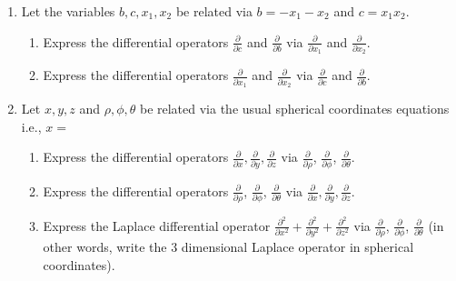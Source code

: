 \begin{enumerate}
\item Let the variables $b,c, x_1, x_2$ be related via $b=-x_1-x_2 $ and $c=x_1 x_2$.
\begin{enumerate}
\item Express the differential operators $\frac{\partial}{\partial c}$ and $\frac{\partial}{\partial b}$ via $\frac{\partial}{\partial x_1}$ and $\frac{\partial}{\partial x_2}$.
\item Express the differential operators  $\frac{\partial}{\partial x_1}$ and $\frac{\partial}{\partial x_2}$ via $\frac{\partial}{\partial c}$ and $\frac{\partial}{\partial b}$. 
\end{enumerate}

\item Let $x,y,z$ and $\rho, \phi,\theta$ be related via the usual spherical coordinates equations i.e., $x= $
\begin{enumerate}
\item \label{problemd/dx,d/dy,d/dzinspherical} Express the differential operators $\frac{\partial }{\partial x}, \frac{\partial }{\partial y}, \frac{\partial}{\partial z}$ via $\frac{\partial }{\partial \rho}$, $\frac{\partial }{\partial \phi}$, $\frac{\partial }{\partial \theta}$.

\item Express the differential operators $\frac{\partial }{\partial \rho}$, $\frac{\partial }{\partial \phi}$, $\frac{\partial }{\partial \theta}$ via $\frac{\partial }{\partial x}, \frac{\partial }{\partial y}, \frac{\partial}{\partial z}$.
\item \label{problemLaplaceInSpherical} Express the Laplace differential operator $\frac{\partial^2}{\partial x^2}+\frac{\partial^2}{\partial y^2}+\frac{\partial^2}{\partial z^2}$ via  $\frac{\partial }{\partial \rho}$, $\frac{\partial }{\partial \phi}$, $\frac{\partial }{\partial \theta}$ (in other words, write the 3 dimensional Laplace operator in spherical coordinates).

\end{enumerate}
\end{enumerate}